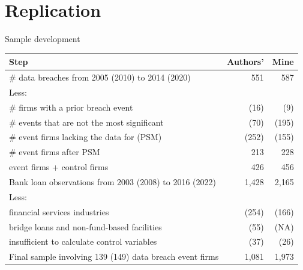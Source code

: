 \documentclass[13pt]{beamer}
\begin{document}
\section{Replication}

\begin{frame}
  {Sample development}
  \scriptsize
  \begin{table}[ht]
    \centering
    \label{my-label}
    \begin{tabular}{@{}lrr@{}}
      \toprule
      \textbf{Step}                                            & \textbf{Authors'} & \textbf{Mine} \\ \midrule
      \# data breaches from 2005 (2010) to 2014 (2020)         & 551               & 587           \\
      Less:                                                    &                   &               \\
      \quad \# firms with a prior breach event                 & (16)              & (9)           \\
      \quad \# events that are not the most significant        & (70)              & (195)         \\
      \quad \# event firms lacking the data for (PSM)          & (252)             & (155)         \\
      \# event firms after PSM                                 & 213               & 228           \\
      event firms + control firms                              & 426               & 456           \\
      Bank loan observations from 2003 (2008) to 2016 (2022)   & 1,428             & 2,165         \\
      Less:                                                    &                   &               \\
      \quad financial services industries                      & (254)             & (166)         \\
      \quad bridge loans and non-fund-based facilities         & (55)              & (NA)          \\
      \quad insufficient to calculate control variables        & (37)              & (26)          \\
      Final sample involving 139 (149) data breach event firms & 1,081             & 1,973         \\ \bottomrule
    \end{tabular}
  \end{table}

\end{frame}
\end{document}
